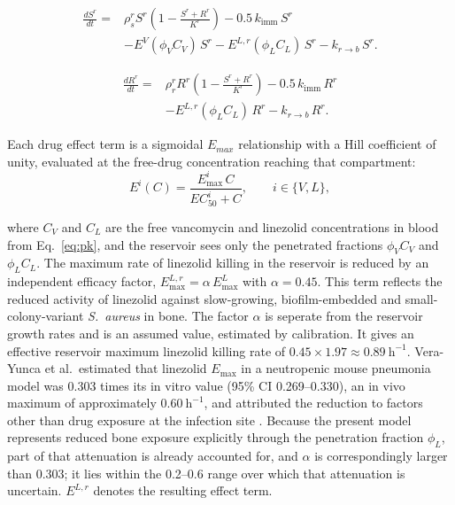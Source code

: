 \documentclass[journal]{IEEEtran}
\begin{document}
\begin{equation}
\label{eq:dSrdt}
\begin{aligned}
\frac{dS^r}{dt}
= {}& \rho_{s}^{r} S^{r} \left( 1 - \frac{S^r + R^r}{K^r} \right)
- 0.5\, k_{\text{imm}}\, S^r \\
&- E^{V}(\phi_{V} C_V)\, S^r
- E^{L,r}(\phi_{L} C_L)\, S^r
- k_{r\to b}\, S^r .
\end{aligned}
\end{equation}

\begin{equation}
\label{eq:dRrdt}
\begin{aligned}
\frac{dR^r}{dt}
= {}& \rho_{r}^{r} R^{r} \left( 1 - \frac{S^r + R^r}{K^r} \right)
- 0.5\, k_{\text{imm}}\, R^r \\
&- E^{L,r}(\phi_{L} C_L)\, R^r
- k_{r\to b}\, R^r .
\end{aligned}
\end{equation}

Each drug effect term is a sigmoidal $E_{max}$ relationship with a Hill
coefficient of unity, evaluated at the free-drug concentration reaching
that compartment:
\begin{equation}
E^{i}(C) = \frac{E_{\max}^{i}\, C}{EC_{50}^{i} + C},
\qquad i \in \{V, L\},
\label{eq:hill}
\end{equation}

where $C_V$ and $C_L$ are the free vancomycin and linezolid
concentrations in blood from Eq.~\eqref{eq:pk}, and the reservoir sees
only the penetrated fractions $\phi_V C_V$ and $\phi_L C_L$. The maximum rate of linezolid killing in the
reservoir is reduced by an independent efficacy factor,
$E_{\max}^{L,r} = \alpha\,E_{\max}^{L}$ with $\alpha = 0.45$.   This term reflects the
reduced activity of linezolid against slow-growing, biofilm-embedded and
small-colony-variant \textit{S.~aureus} in bone. The factor $\alpha$ is seperate
from the reservoir growth rates and is an assumed value, estimated by calibration.
It gives an effective reservoir maximum linezolid killing rate of
$0.45 \times 1.97 \approx 0.89~\mathrm{h}^{-1}$. Vera-Yunca et al.\ estimated that linezolid
$E_{\max}$ in a neutropenic mouse pneumonia model was 0.303 times its in vitro value (95\% CI
0.269--0.330), an in vivo maximum of approximately $0.60~\mathrm{h}^{-1}$, and attributed the
reduction to factors other than drug exposure at the infection site \cite{VeraYunca2025}.
Because the present model represents reduced bone exposure explicitly through the penetration
fraction $\phi_L$, part of that attenuation is already accounted for, and $\alpha$ is
correspondingly larger than 0.303; it lies within the 0.2--0.6 range over which that
attenuation is uncertain.
$E^{L,r}$ denotes the resulting effect term.
\end{document}
